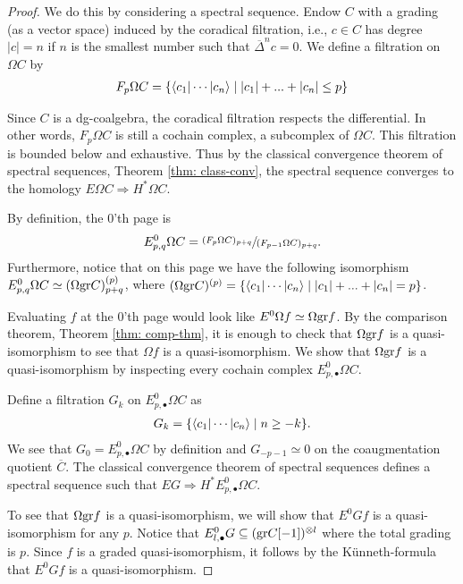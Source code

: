 \documentclass[../thesis.tex]{subfiles}
\begin{document}
            \begin{proof}
                We do this by considering a spectral sequence. Endow $C$ with a grading (as a vector space) induced by the coradical filtration, i.e., $c\in C$ has degree $|c|=n$ if $n$ is the smallest number such that $\overline{\Delta}^nc = 0$. We define a filtration on $\Omega C$ by
                \begin{align*}
                    F_p\Omega C = \startset{\langle c_1 | \cdots | c_n \rangle \mid |c_1|+...+|c_n|\leq p}
                \end{align*}

                Since $C$ is a dg-coalgebra, the coradical filtration respects the differential. In other words, $F_p\Omega C$ is still a cochain complex, a subcomplex of $\Omega C$. This filtration is bounded below and exhaustive. Thus by the classical convergence theorem of spectral sequences, Theorem \ref{thm: class-conv}, the spectral sequence converges to the homology $E\Omega C \Rightarrow H^*\Omega C$.

                By definition, the $0$'th page is 
                \begin{align*}
                    E^0_{p,q}\Omega C = \sfrac{(F_p\Omega C)_{p+q}}{(F_{p-1}\Omega C)_{p+q}}\tt{.}
                \end{align*}
                Furthermore, notice that on this page we have the following isomorphism $E^0_{p,q}\Omega C \simeq (\Omega \tt{gr}C)^{(p)}_{p+q}$, where $(\Omega \tt{gr}C)^{(p)} = \startset{\langle c_1 | \cdots | c_n \rangle \mid |c_1|+...+|c_n| = p}$.

                Evaluating $f$ at the $0$'th page would look like $E^0\Omega f \simeq \Omega \tt{gr}f$. By the comparison theorem, Theorem \ref{thm: comp-thm}, it is enough to check that $\Omega \tt{gr}f$ is a quasi-isomorphism to see that $\Omega f$ is a quasi-isomorphism. We show that $\Omega \tt{gr}f$ is a quasi-isomorphism by inspecting every cochain complex $E^0_{p,\bullet}\Omega C$.

                Define a filtration $G_k$ on $E^0_{p,\bullet}\Omega C$ as
                \begin{align*}
                    G_k = \startset{\langle c_1 | \cdots | c_n \rangle \mid n \geq -k}.
                \end{align*}
                We see that $G_0 = E^0_{p, \bullet}\Omega C$ by definition and $G_{-p-1} \simeq 0$ on the coaugmentation quotient $\overline{C}$. The classical convergence theorem of spectral sequences defines a spectral sequence such that $EG \Rightarrow H^*E^0_{p, \bullet}\Omega C$.

                To see that $\Omega \tt{gr}f$ is a quasi-isomorphism, we will show that $E^0Gf$ is a quasi-isomorphism for any $p$. Notice that $E^0_{l,\bullet}G \subseteq (\tt{gr}C[-1])^{\otimes l}$ where the total grading is $p$. Since $f$ is a graded quasi-isomorphism, it follows by the K\"unneth-formula \cite[Theorem 3.6.3][88]{Weibel94} that $E^0Gf$ is a quasi-isomorphism.
            \end{proof}
\end{document}
